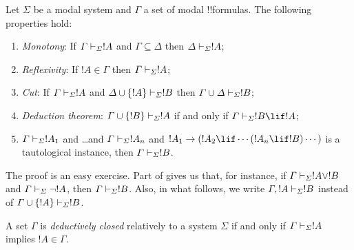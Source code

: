 \documentclass[../../../include/open-logic-section]{subfiles}
\begin{document}


\begin{prop}
  Let $\Sigma$ be a modal system and $\Gamma$ a set of modal
  !!{formula}s. The following properties hold:
  \begin{enumerate}
  \item{} \emph{Monotony}: If
    $\Gamma \Proves[\Sigma] !A$ and $\Gamma \subseteq \Delta$ then
    $\Delta \Proves[\Sigma] !A$;
  \item{}
    \emph{Reflexivity}: If $!A \in \Gamma$ then $\Gamma
    \Proves[\Sigma] !A$;
  \item{} \emph{Cut}: If $\Gamma
    \Proves[\Sigma] !A$ and $\Delta \cup \{!A\} \Proves[\Sigma] !B$
    then $\Gamma \cup \Delta \Proves[\Sigma] !B$;
  \item{} \emph{Deduction theorem}: $\Gamma \cup \{!B\}
    \Proves[\Sigma] !A$ if and only if $\Gamma \Proves[\Sigma] !B \lif
      !A$;
  \item {}%
    $\Gamma \Proves[\Sigma] !A_1$ and \dots and $\Gamma
    \Proves[\Sigma] !A_n$ and $!A_1 \to (!A_2 \lif \cdots (!A_n \lif
    !B)\cdots)$ is a tautological instance, then $\Gamma
    \Proves[\Sigma] !B$.
  \end{enumerate}
\end{prop}

The proof is an easy exercise. Part
 of 
gives us that, for instance, if $\Gamma \Proves[\Sigma] !A \lor !B$
and $\Gamma \Proves[\Sigma] \lnot !A$, then $\Gamma \Proves[\Sigma]
!B$. Also, in what follows, we write $\Gamma, !A \Proves[\Sigma] !B$
instead of $\Gamma \cup \{ !A\} \Proves[\Sigma] !B$.

\begin{defn}
  A set $\Gamma$ is \emph{deductively closed} relatively to a system
  $\Sigma$ if and only if $\Gamma \Proves[\Sigma] !A$ implies
  $!A \in \Gamma$.
\end{defn}
\end{document}
